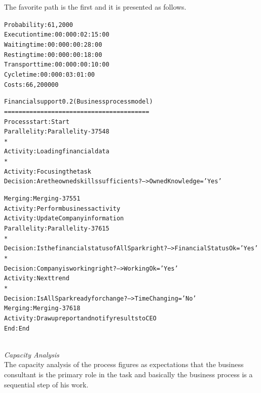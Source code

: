 The favorite path is the first and it is presented as follows.\\

\begin{alltt}
Probability:   61,2000%
Execution time:  00:000:02:15:00
Waiting time:  00:000:00:28:00
Resting time:  00:000:00:18:00
Transport time:  00:000:00:10:00
Cycle time:  00:000:03:01:00
Costs:  66,200000

Financial support 0.2 (Business process model)
========================================
Process start: Start
Parallelity: Parallelity-37548
    *
    Activity: Loading financial data
    *
    Activity: Focusing the task
    Decision: Are the owned skills sufficients? --> OwnedKnowledge='Yes'

Merging: Merging-37551
Activity: Perform business activity
Activity: Update Company information
Parallelity: Parallelity-37615
    *
    Decision: Is the financial status of AllSpark right? --> FinancialStatusOk='Yes'
    *
    Decision: Company is working right? --> WorkingOk='Yes'
    Activity: Next trend
    *
    Decision: Is AllSpark ready for change? --> TimeChanging='No'
Merging: Merging-37618
Activity: Draw up report and notify results to CEO
End: End
\end{alltt}\\

\noindent
\emph{Capacity Analysis}\\
The capacity analysis of the process figures as expectations that the business consultant is the primary role in the task and basically the business process is a sequential step of his work.


